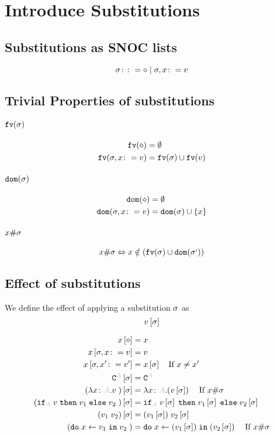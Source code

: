 \documentclass{report}
\begin{document}
\section{Introduce Substitutions}
\subsection{Substitutions as SNOC lists}

\begin{equation}
   \sigma \colon\colon= \diamond \mid \sigma, x \colon= v
\end{equation}

\subsection{Trivial Properties of substitutions}
\paragraph{$\texttt{fv}(\sigma)$}
\begin{align*}
    \texttt{fv}(\diamond) &= \emptyset\\
    \texttt{fv}(\sigma, x\colon= v) &= \texttt{fv}(\sigma)\cup\texttt{fv}(v)
\end{align*}
\paragraph{$\texttt{dom}(\sigma)$}
\begin{align*}
    \texttt{dom}(\diamond) & = \emptyset\\
    \texttt{dom}(\sigma, x\colon= v) & = \texttt{dom}(\sigma)\cup\left\{x\right\}
\end{align*}

\paragraph{$x \# \sigma$}
\begin{equation}
    x \# \sigma \Leftrightarrow x\notin(\texttt{fv}(\sigma)\cup\texttt{dom}(\sigma`))
\end{equation}

\subsection{Effect of substitutions}
    We define the effect of applying a substitution $\sigma$ as 
    $$v\left[\sigma\right]$$

    
    \begin{align*}
        x\sub{\nil} & = x \\
        x\sub{\si,x\setto v} & = v \\
        x\sub{\si,x'\setto v'} & = x\ssi\qt{If }x \neq x'\\
        \const{A}\ssi & = \const{A} \\
        (\lam{x}{A}{v})\ssi &= \lam{x}{A}{(v\ssi)}\qt{If }x\#\si\\
        (\pifthenelse{A}{v}{v_1}{v_2})\ssi &= \pifthenelse{A}{v\ssi}{v_1\ssi}{v_2\ssi}\\
        (\apply{v_1}{v_2})\ssi&= \apply{(v_1\ssi)}{v_2\ssi}\\
        (\doin{x}{v_1}{v_2})&= \doin{x}{(v_1\ssi)}{(v_2\ssi)}\qt{If } x\#\si\\
    \end{align*}
\end{document}
